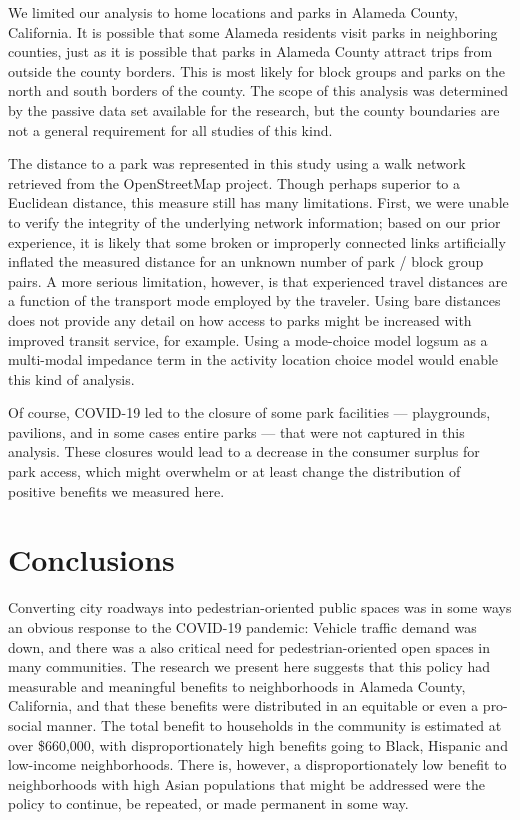 \documentclass[3p, authoryear, review]{elsarticle} %
\begin{document}
We limited our analysis to home locations and parks in Alameda County,
California. It is possible that some Alameda residents visit parks in
neighboring counties, just as it is possible that parks in Alameda County
attract trips from outside the county borders. This is most likely for block
groups and parks on the north and south borders of the county. The scope of this
analysis was determined by the passive data set available for the research, but
the county boundaries are not a general requirement for all studies of this
kind.

The distance to a park was represented in this study using a walk network
retrieved from the OpenStreetMap project. Though perhaps superior to a Euclidean
distance, this measure still has many limitations. First, we were unable to
verify the integrity of the underlying network information; based on our prior
experience, it is likely that some broken or improperly connected links
artificially inflated the measured distance for an unknown number of park /
block group pairs. A more serious limitation, however, is that experienced
travel distances are a function of the transport mode employed by the traveler.
Using bare distances does not provide any detail on how access to parks might be
increased with improved transit service, for example. Using a mode-choice model
logsum as a multi-modal impedance term in the activity location choice model
would enable this kind of analysis.

Of course, COVID-19 led to the closure of some park facilities --- playgrounds,
pavilions, and in some cases entire parks --- that were not captured in this
analysis. These closures would lead to a decrease in the consumer surplus for
park access, which might overwhelm or at least change the distribution of
positive benefits we measured here.

\hypertarget{conclusions}{%
\section{Conclusions}\label{conclusions}}

Converting city roadways into pedestrian-oriented public spaces was in some ways
an obvious response to the COVID-19 pandemic: Vehicle traffic demand was down,
and there was a also critical need for pedestrian-oriented open spaces in many
communities. The research we present here suggests that this policy had
measurable and meaningful benefits to neighborhoods in Alameda County,
California, and that these benefits were distributed in an equitable or even a
pro-social manner. The total benefit to households in the community is estimated
at over \$660,000, with disproportionately high benefits going to Black, Hispanic
and low-income neighborhoods. There is, however, a disproportionately low
benefit to neighborhoods with high Asian populations that might be addressed
were the policy to continue, be repeated, or made permanent in some way.
\end{document}
